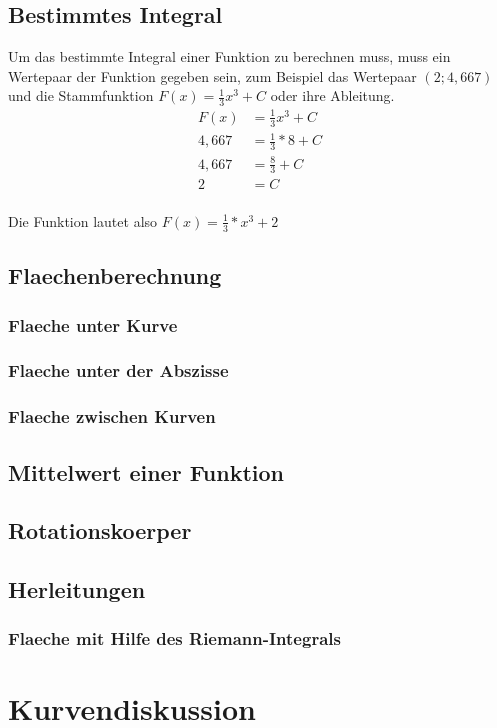 \documentclass[a4paper]{article} %
\begin{document}
	\subsection{Bestimmtes Integral}
	Um das bestimmte Integral einer Funktion zu berechnen muss, muss ein Wertepaar der Funktion gegeben sein, zum Beispiel
	das Wertepaar $(2;4,667)$ und die Stammfunktion $F(x)=\frac{1}{3}x^3+C$ oder ihre Ableitung.\\
	\begin{align*}
	F(x) & =\frac{1}{3}x^3+C\\
	4,667 &= \frac{1}{3}*8+C\\
	4,667 &= \frac{8}{3}+C\\
	2 & =C
	\end{align*}\\
	Die Funktion lautet also $F(x)=\frac{1}{3}*x^3+2$
	\subsection{Flaechenberechnung}
	\subsubsection{Flaeche unter Kurve}
	\subsubsection{Flaeche unter der Abszisse}
	\subsubsection{Flaeche zwischen Kurven}
	\subsection{Mittelwert einer Funktion}
	\subsection{Rotationskoerper}                                                      
	\subsection{Herleitungen}
	\subsubsection{Flaeche mit Hilfe des Riemann-Integrals}
	\section{Kurvendiskussion}
\end{document}
